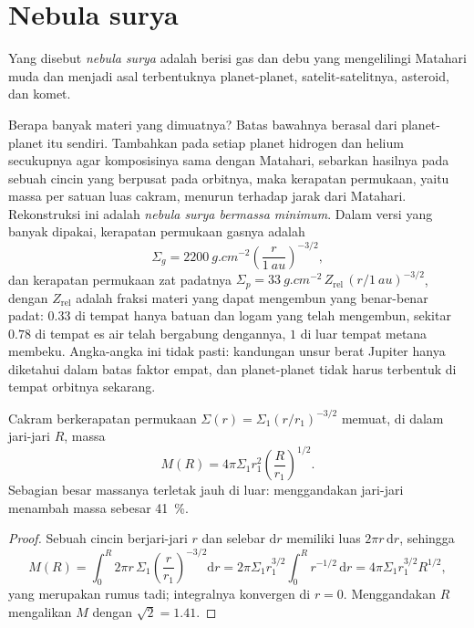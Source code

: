 \section{Nebula surya}

\begin{definition}\label{def:b2:planet-formation-meteorites:nebula}
Yang disebut \emph{nebula surya} adalah  berisi gas
dan debu yang mengelilingi Matahari muda dan menjadi asal terbentuknya planet-planet,
satelit-satelitnya, asteroid, dan komet.
\end{definition}

Berapa banyak materi yang dimuatnya? Batas bawahnya berasal dari planet-planet itu sendiri.
Tambahkan pada setiap planet hidrogen dan helium secukupnya agar komposisinya sama dengan
Matahari, sebarkan hasilnya pada sebuah cincin yang berpusat pada orbitnya, maka kerapatan
permukaan, yaitu massa per satuan luas cakram, menurun terhadap jarak dari
Matahari. Rekonstruksi ini adalah \emph{nebula surya bermassa
minimum}. Dalam versi yang banyak dipakai, kerapatan
permukaan gasnya adalah
\[
  \Sigma_g = \qty{2200}{g.cm^{-2}}\left(\frac{r}{\qty{1}{au}}\right)^{-3/2},
\]
dan kerapatan permukaan zat padatnya $\Sigma_p = \qty{33}{g.cm^{-2}}\,Z_{\mathrm{rel}}\,
(r/\qty{1}{au})^{-3/2}$, dengan $Z_{\mathrm{rel}}$ adalah fraksi materi yang dapat
mengembun yang benar-benar padat: $0.33$ di tempat hanya batuan dan logam yang telah
mengembun, sekitar $0.78$ di tempat es air telah bergabung dengannya, $1$ di luar tempat
metana membeku. Angka-angka ini tidak pasti: kandungan unsur berat
Jupiter hanya diketahui dalam batas faktor empat, dan planet-planet tidak harus
terbentuk di tempat orbitnya sekarang.

\begin{proposition}\label{prop:b2:planet-formation-meteorites:disc-mass}
Cakram berkerapatan permukaan $\Sigma(r) = \Sigma_1 (r/r_1)^{-3/2}$ memuat, di dalam
jari-jari $R$, massa
\[
  M(R) = 4\pi\Sigma_1 r_1^2 \left(\frac{R}{r_1}\right)^{1/2}.
\]
Sebagian besar massanya terletak jauh di luar: menggandakan jari-jari menambah massa
sebesar \qty{41}{\percent}.
\end{proposition}

\begin{proof}
Sebuah cincin berjari-jari $r$ dan selebar $\mathrm dr$ memiliki luas $2\pi r\,\mathrm dr$, sehingga
\[
  M(R) = \int_0^R 2\pi r\,\Sigma_1 \left(\frac{r}{r_1}\right)^{-3/2}\mathrm dr
       = 2\pi\Sigma_1 r_1^{3/2}\int_0^R r^{-1/2}\,\mathrm dr
       = 4\pi\Sigma_1 r_1^{3/2} R^{1/2},
\]
yang merupakan rumus tadi; integralnya konvergen di $r = 0$. Menggandakan $R$
mengalikan $M$ dengan $\sqrt 2 = 1.41$.
\end{proof}


